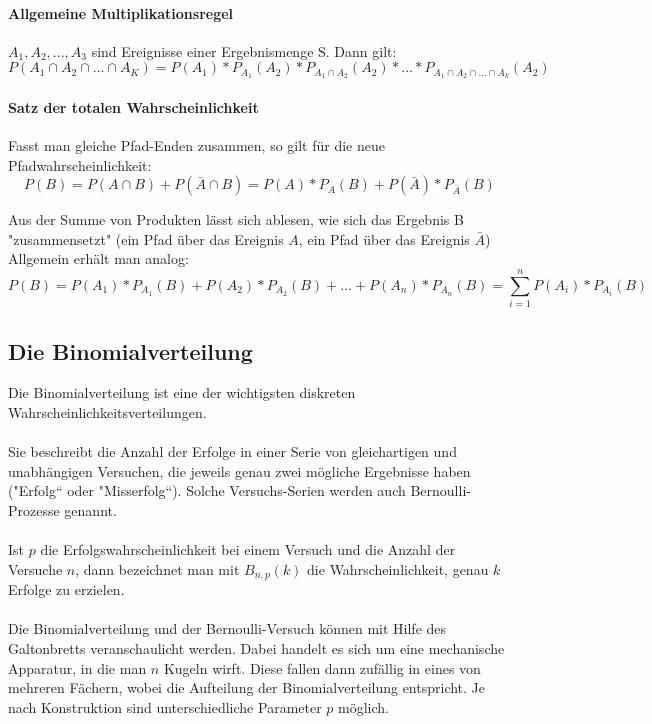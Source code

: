 \documentclass[a4paper,10pt,DIV9, BCOR12mm, oneside,openright,openbib]{scrreprt}
\theoremstyle{definition}
\theoremstyle{plain}
\begin{document}
\paragraph{Allgemeine Multiplikationsregel}
$ A_{1}, A_{2}, ..., A_{3} $ sind Ereignisse einer Ergebnismenge S. Dann gilt: \\
\[ P(A_{1} \cap A_{2} \cap ... \cap A_{K}) = P(A_{1}) * P_{A_{1}}(A_{2}) * P_{A_{1} \cap A_{2} }(A_{2}) * ... * P_{A_{1} \cap A_{2} \cap ... \cap A_{k}}(A_{2})\]
\paragraph{Satz der totalen Wahrscheinlichkeit}
Fasst man gleiche Pfad-Enden zusammen, so gilt für die neue Pfadwahrscheinlichkeit:
\[ P(B) = P(A \cap B) + P(\bar{A} \cap B) = P(A) * P_{A}(B) + P(\bar{A})  * P_{\bar{A}}(B) \]

Aus der Summe von Produkten lässt sich ablesen, wie sich das Ergebnis B "zusammensetzt" (ein Pfad über das Ereignis $ A $, ein Pfad über das Ereignis $ \bar{A} $) \\
Allgemein erhält man analog:
\[ P(B) = P(A_{1}) * P_{A_{1}}(B) + P(A_{2}) * P_{A_{2}}(B) + ... + P(A_{n}) * P_{A_{n}}(B) = \displaystyle\sum_{i=1}^n P(A_{i}) * P_{A_{i}}(B) \]

\subsection{Die Binomialverteilung}
Die Binomialverteilung ist eine der wichtigsten diskreten Wahrscheinlichkeitsverteilungen.\\
\\
Sie beschreibt die Anzahl der Erfolge in einer Serie von gleichartigen und unabhängigen Versuchen, die jeweils genau zwei mögliche Ergebnisse haben ("Erfolg“ oder "Misserfolg“). Solche Versuchs-Serien werden auch Bernoulli-Prozesse genannt.\\
\\
Ist $ p $ die Erfolgswahrscheinlichkeit bei einem Versuch und die Anzahl der Versuche $ n $, dann bezeichnet man mit $ B_{n,p}(k) $ die Wahrscheinlichkeit, genau $ k $ Erfolge zu erzielen.\\
\\
Die Binomialverteilung und der Bernoulli-Versuch können mit Hilfe des Galtonbretts veranschaulicht werden. Dabei handelt es sich um eine mechanische Apparatur, in die man $ n $ Kugeln wirft. Diese fallen dann zufällig in eines von mehreren Fächern, wobei die Aufteilung der Binomialverteilung entspricht. Je nach Konstruktion sind unterschiedliche Parameter $ p $ möglich.\\
\end{document}
